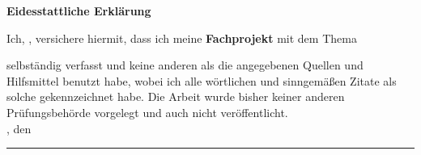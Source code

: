 \clearpage
\vspace*{\fill}
\LARGE{\textbf{Eidesstattliche Erklärung}}\\[1ex]
\normalsize



Ich, \authorName, versichere hiermit, dass ich meine \textbf{Fachprojekt} mit dem
Thema
\begin{quote}
\textit{\completeTitle}
\end{quote}
selbständig verfasst und keine anderen als die angegebenen Quellen und Hilfsmittel benutzt habe,
wobei ich alle wörtlichen und sinngemäßen Zitate als solche gekennzeichnet habe. Die Arbeit
wurde bisher keiner anderen Prüfungsbehörde vorgelegt und auch nicht veröffentlicht.\\[1ex]

\deliveryPlace, den \deadline

\rule[0.2cm]{5.5cm}{0.5pt}

\textsc{\authorName}
